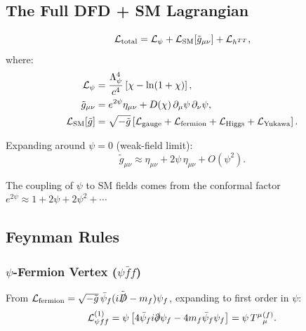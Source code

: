 \documentclass[11pt,a4paper]{article}
\begin{document}
\subsection{The Full DFD + SM Lagrangian}

\begin{equation}\label{eq:full-lagrangian}
\mathcal{L}_{\rm total} = \mathcal{L}_\psi + \mathcal{L}_{\rm SM}[\tilde{g}_{\mu\nu}] + \mathcal{L}_{h^{TT}},
\end{equation}
where:
\begin{align}
\mathcal{L}_\psi &= \frac{\Lambda_\psi^4}{c^4}\left[\chi - \ln(1+\chi)\right], \\
\tilde{g}_{\mu\nu} &= e^{2\psi}\eta_{\mu\nu} + D(\chi)\,\partial_\mu\psi\,\partial_\nu\psi, \\
\mathcal{L}_{\rm SM}[\tilde{g}] &= \sqrt{-\tilde{g}}\left[\mathcal{L}_{\rm gauge} + \mathcal{L}_{\rm fermion} + \mathcal{L}_{\rm Higgs} + \mathcal{L}_{\rm Yukawa}\right].
\end{align}

Expanding around $\psi = 0$ (weak-field limit):
\begin{equation}
\tilde{g}_{\mu\nu} \approx \eta_{\mu\nu} + 2\psi\,\eta_{\mu\nu} + O(\psi^2).
\end{equation}

The coupling of $\psi$ to SM fields comes from the conformal factor $e^{2\psi} \approx 1 + 2\psi + 2\psi^2 + \cdots$

\subsection{Feynman Rules}

\subsubsection{$\psi$-Fermion Vertex ($\psi\bar f f$)}

From $\mathcal{L}_{\rm fermion} = \sqrt{-\tilde{g}}\,\bar\psi_f(i\tilde{\slashed{D}} - m_f)\psi_f$, expanding to first order in $\psi$:
\begin{equation}
\mathcal{L}_{\psi ff}^{(1)} = \psi\left[4\bar\psi_f i\slashed{\partial}\psi_f - 4m_f\bar\psi_f\psi_f\right] = \psi\,T^\mu{}_\mu^{(f)}.
\end{equation}

\begin{center}
\end{center}
\end{document}

